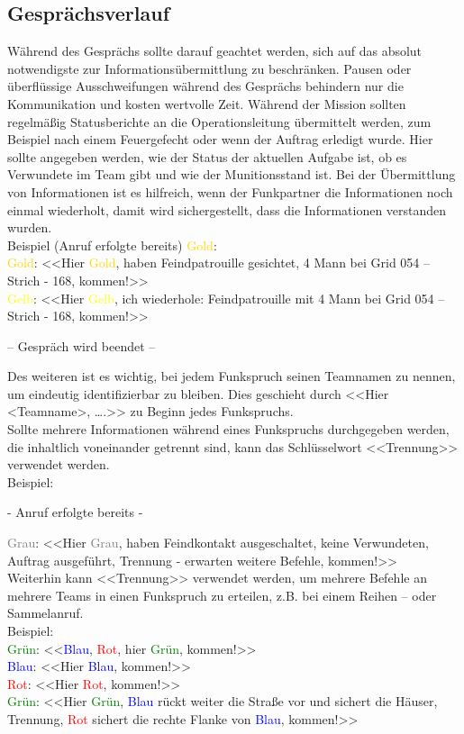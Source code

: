\subsection{Gesprächsverlauf}
	Während des Gesprächs sollte darauf geachtet werden, sich auf das absolut notwendigste zur Informationsübermittlung zu beschränken. Pausen oder überflüssige Ausschweifungen während des Gesprächs behindern nur die Kommunikation und kosten wertvolle Zeit. Während der Mission sollten regelmäßig Statusberichte an die Operationsleitung übermittelt werden, zum Beispiel nach einem Feuergefecht oder wenn der Auftrag erledigt wurde. Hier sollte angegeben werden, wie der Status der aktuellen Aufgabe ist, ob es Verwundete im Team gibt und wie der Munitionsstand ist. Bei der Übermittlung von Informationen ist es hilfreich, wenn der Funkpartner die Informationen noch einmal wiederholt, damit wird sichergestellt, dass die Informationen verstanden wurden. \\
	Beispiel (Anruf erfolgte bereits) \textcolor{gold}{Gold}: \\
	\textcolor{gold}{Gold}: <<Hier \textcolor{gold}{Gold}, haben Feindpatrouille gesichtet, 4 Mann bei Grid 054 –Strich - 168, kommen!>> \\
	\textcolor{yellow}{Gelb}: <<Hier \textcolor{yellow}{Gelb}, ich wiederhole: Feindpatrouille mit 4 Mann bei Grid 054 – Strich - 168, kommen!>> \\
		\begin{center}
		– Gespräch wird beendet –
		\end{center}
	Des weiteren ist es wichtig, bei jedem Funkspruch seinen Teamnamen zu nennen, um eindeutig identifizierbar zu bleiben. Dies geschieht durch <<Hier <Teamname>, ….>> zu Beginn jedes Funkspruchs. \\
	Sollte mehrere Informationen während eines Funkspruchs durchgegeben werden, die inhaltlich voneinander getrennt sind, kann das Schlüsselwort <<Trennung>> verwendet werden. \\
	Beispiel: \\
		\begin{center}
		- Anruf erfolgte bereits -
		\end{center}
	\textcolor{gray}{Grau}: <<Hier \textcolor{gray}{Grau}, haben Feindkontakt ausgeschaltet, keine Verwundeten, Auftrag ausgeführt, Trennung - erwarten weitere Befehle, kommen!>> \\
	Weiterhin kann <<Trennung>> verwendet werden, um mehrere Befehle an mehrere Teams in einen Funkspruch zu erteilen, z.B. bei einem Reihen – oder Sammelanruf. \\
	Beispiel: \\
	\textcolor{green}{Grün}: <<\textcolor{blue}{Blau}, \textcolor{red}{Rot}, hier \textcolor{green}{Grün}, kommen!>> \\
	\textcolor{blue}{Blau}: <<Hier \textcolor{blue}{Blau}, kommen!>> \\
	\textcolor{red}{Rot}: <<Hier \textcolor{red}{Rot}, kommen!>> \\
	\textcolor{green}{Grün}: <<Hier \textcolor{green}{Grün}, \textcolor{blue}{Blau} rückt weiter die Straße vor und sichert die Häuser, Trennung, \textcolor{red}{Rot} sichert die rechte Flanke von \textcolor{blue}{Blau}, kommen!>> \\

